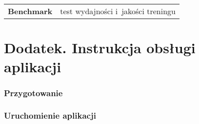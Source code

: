 \documentclass[pl]{minipw} %
\begin{document}
\begin{tabularx}{\textwidth}{cX}
\textbf{Benchmark} & test wydajności i~jakości treningu \\

\end{tabularx}


\listoffigures


\listoftables

\chapter*{Dodatek. Instrukcja obsługi aplikacji}
\subsection*{Przygotowanie}
 
\subsection*{Uruchomienie aplikacji}

\clearpage
\end{document}
